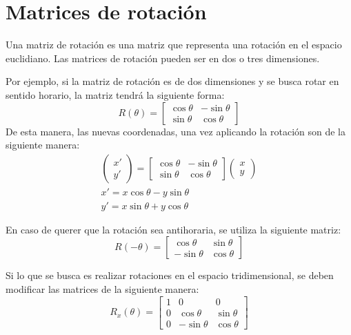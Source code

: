 
\chapter{Matrices de rotaci\'on}
	Una matriz de rotaci\'on es una matriz que representa una rotaci\'on en el espacio euclidiano.
	Las matrices de rotaci\'on pueden ser en dos o tres dimensiones.
	
	Por ejemplo, si la matriz de rotaci\'on es de dos dimensiones y se busca rotar en sentido horario, la matriz tendrá la siguiente forma:
	\begin{equation}
		R(\theta)=
		\begin{bmatrix}
			\cos \theta & -\sin \theta\\
			\sin \theta & \cos \theta
		\end{bmatrix}
	\end{equation}
	De esta manera, las nuevas coordenadas, una vez aplicando la rotación son de la siguiente manera:
	\begin{eqnarray}
		\left(
		\begin{matrix}
			x'\\
			y'
		\end{matrix}
		\right)
		=
		\begin{bmatrix}
			\cos \theta & -\sin \theta\\
			\sin \theta & \cos \theta
		\end{bmatrix}
		\left(
		\begin{matrix}
			x\\
			y
		\end{matrix}
		\right)\\
		x'=x\cos \theta -y\sin \theta\\
		y'=x\sin \theta + y \cos \theta
	\end{eqnarray}

En caso de querer que la rotación sea antihoraria, se utiliza la siguiente matriz:
\begin{equation}
	R(-\theta)=
	\begin{bmatrix}
		\cos \theta & \sin \theta\\
		-\sin \theta & \cos \theta
	\end{bmatrix}
\end{equation}

Si lo que se busca es realizar rotaciones en el espacio tridimensional, se deben modificar las matrices de la siguiente manera:
\begin{equation}
	R_x(\theta)=
	\begin{bmatrix}
		1 & 0 & 0\\
		0 & \cos \theta & \sin \theta\\
		0 & -\sin \theta & \cos \theta
	\end{bmatrix}
\end{equation}

